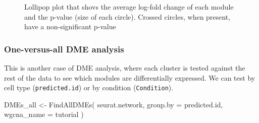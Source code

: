 \documentclass[
  letterpaper,
  DIV=11,
  numbers=noendperiod]{scrartcl}
\newenvironment{Shaded}{\begin{snugshade}}{\end{snugshade}}
\newcommand{\AttributeTok}[1]{\textcolor[rgb]{0.40,0.45,0.13}{#1}}
\newcommand{\FunctionTok}[1]{\textcolor[rgb]{0.28,0.35,0.67}{#1}}
\newcommand{\NormalTok}[1]{\textcolor[rgb]{0.00,0.23,0.31}{#1}}
\newcommand{\OtherTok}[1]{\textcolor[rgb]{0.00,0.23,0.31}{#1}}
\newcommand{\StringTok}[1]{\textcolor[rgb]{0.13,0.47,0.30}{#1}}
\begin{document}
\begin{figure}[H]


\caption{\label{fig-lol}Lollipop plot that shovs the average log-fold
change of each module and the p-value (size of each circle). Crossed
circles, when present, have a non-significant p-value}

\end{figure}%

\subsubsection{One-versus-all DME
analysis}\label{one-versus-all-dme-analysis}

This is another case of DME analysis, where each cluster is tested
against the rest of the data to see which modules are differentially
expressed. We can test by cell type (\texttt{predicted.id}) or by
condition (\texttt{Condition}).

\begin{Shaded}
\begin{Highlighting}[]
\NormalTok{DMEs\_all }\OtherTok{\textless{}{-}} \FunctionTok{FindAllDMEs}\NormalTok{(}
\NormalTok{  seurat.network,}
  \AttributeTok{group.by =} \StringTok{\textquotesingle{}predicted.id\textquotesingle{}}\NormalTok{,}
  \AttributeTok{wgcna\_name =} \StringTok{\textquotesingle{}tutorial\textquotesingle{}}
\NormalTok{) }
\end{Highlighting}
\end{Shaded}
\end{document}
